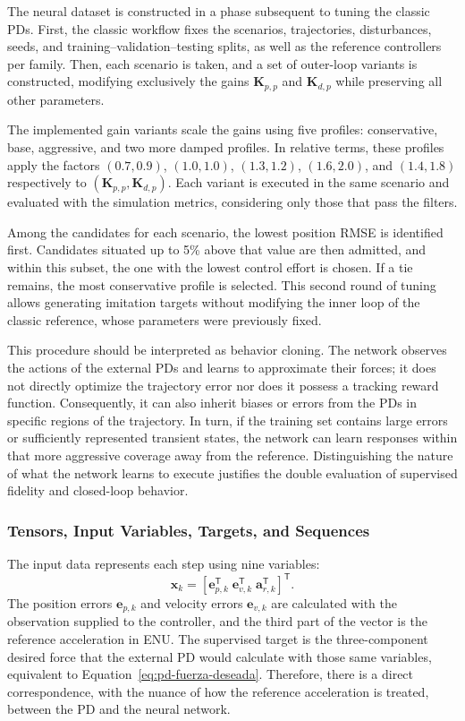 The neural dataset is constructed in a phase subsequent to tuning the classic PDs. First, the classic workflow fixes the scenarios, trajectories, disturbances, seeds, and training--validation--testing splits, as well as the reference controllers per family. Then, each scenario is taken, and a set of outer-loop variants is constructed, modifying exclusively the gains $\bm{K}_{p,p}$ and $\bm{K}_{d,p}$ while preserving all other parameters.

The implemented gain variants scale the gains using five profiles: conservative, base, aggressive, and two more damped profiles. In relative terms, these profiles apply the factors $(0.7,0.9)$, $(1.0,1.0)$, $(1.3,1.2)$, $(1.6,2.0)$, and $(1.4,1.8)$ respectively to $(\bm{K}_{p,p},\bm{K}_{d,p})$. Each variant is executed in the same scenario and evaluated with the simulation metrics, considering only those that pass the filters.

Among the candidates for each scenario, the lowest position RMSE is identified first. Candidates situated up to 5\% above that value are then admitted, and within this subset, the one with the lowest control effort is chosen. If a tie remains, the most conservative profile is selected. This second round of tuning allows generating imitation targets without modifying the inner loop of the classic reference, whose parameters were previously fixed.

This procedure should be interpreted as behavior cloning. The network observes the actions of the external PDs and learns to approximate their forces; it does not directly optimize the trajectory error nor does it possess a tracking reward function. Consequently, it can also inherit biases or errors from the PDs in specific regions of the trajectory. In turn, if the training set contains large errors or sufficiently represented transient states, the network can learn responses within that more aggressive coverage away from the reference. Distinguishing the nature of what the network learns to execute justifies the double evaluation of supervised fidelity and closed-loop behavior.

\subsubsection*{Tensors, Input Variables, Targets, and Sequences}
\label{subsubsec:tensores-entradas-objetivos}

The input data represents each step using nine variables:
\begin{equation}
 \bm{x}_k=[\bm{e}_{p,k}^{\mathsf T}\;
           \bm{e}_{v,k}^{\mathsf T}\;
           \bm{a}_{r,k}^{\mathsf T}]^{\mathsf T}.
 \label{eq:variables-neuronales}
\end{equation}
The position errors $\bm{e}_{p,k}$ and velocity errors $\bm{e}_{v,k}$ are calculated with the observation supplied to the controller, and the third part of the vector is the reference acceleration in ENU. The supervised target is the three-component desired force that the external PD would calculate with those same variables, equivalent to Equation~\ref{eq:pd-fuerza-deseada}. Therefore, there is a direct correspondence, with the nuance of how the reference acceleration is treated, between the PD and the neural network.

